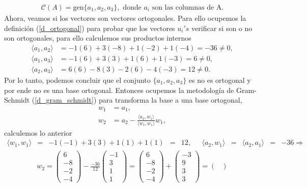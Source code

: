 \documentclass[11pt,letterpaper]{article}
\newcommand{\mcC}{\mathcal{C}}
\newcommand{\gen}{\text{gen}}
\begin{document}
\begin{itemize}
\begin{align*}
\mcC(A)=\gen\{a_1,a_2,a_3\}, \text{   donde } a_i \text{ son las columnas de A}.
\end{align*} 
Ahora, veamos si los vectores son vectores ortogonales. Para ello ocupemos la definición (\ref{d_ortogonal}) para probar que los vectores $u_i's$ verificar si son o no son ortogonales, para ello calculemos sus productos internos
\begin{align*}
\langle a_1, a_2 \rangle &=-1(6)+3(-8)+1(-2)+1(-4)=-36\neq 0,\\
\langle a_1, a_3 \rangle &=-1(6)+3(3)+1(6)+1(-3)=6\neq 0, \\
\langle a_2, a_3 \rangle &= 6(6)-8(3)-2(6)-4(-3)=12\neq 0.
\end{align*} 
Por lo tanto, podemos concluir que el conjunto $\{a_1, a_2,a_3\}$ es no es ortogonal y por ende no es una base ortogonal. Entonces ocupemos la metodología de Gram-Schmidt (\ref{d_gram_schmidt}) para transforma la base a una base ortogonal, 
\begin{align*}
w_1& = a_1,\\
w_2 &= a_2-\frac{\langle a_2, w_1 \rangle}{\langle w_1,w_1 \rangle}w_1,
\end{align*}
calculemos lo anterior 
\begin{align*}
\langle w_1, w_1 \rangle &=& -1(-1)+3(3)+1(1)+1(1)&=&12,\ \ \ & \langle a_2, w_1 \rangle &=& \langle a_2, a_1 \rangle &=&-36\Rightarrow
\end{align*}
\begin{align*}
w_2= \begin{pmatrix}
6\\-8\\-2\\-4
\end{pmatrix}-\frac{-36}{12}\begin{pmatrix}
-1\\3\\1\\1
\end{pmatrix}=\begin{pmatrix}
6\\-8\\-2\\-4
\end{pmatrix}+\begin{pmatrix}
-3\\9\\3\\3
\end{pmatrix}=\begin{pmatrix}

\end{pmatrix}
\end{align*}
\end{itemize}
\end{document}
